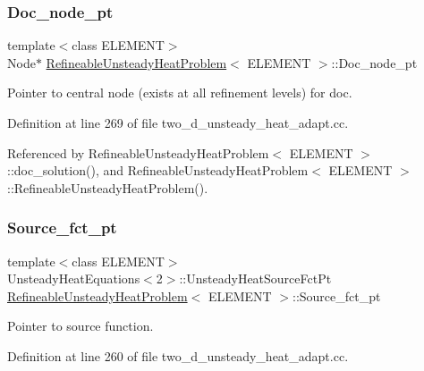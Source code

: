 \subsubsection{\texorpdfstring{Doc\+\_\+node\+\_\+pt}{Doc\_node\_pt}}
{\footnotesize\ttfamily template$<$class E\+L\+E\+M\+E\+NT$>$ \\
Node$\ast$ \hyperlink{classRefineableUnsteadyHeatProblem}{Refineable\+Unsteady\+Heat\+Problem}$<$ E\+L\+E\+M\+E\+NT $>$\+::Doc\+\_\+node\+\_\+pt\hspace{0.3cm}{\ttfamily [private]}}



Pointer to central node (exists at all refinement levels) for doc. 



Definition at line 269 of file two\+\_\+d\+\_\+unsteady\+\_\+heat\+\_\+adapt.\+cc.



Referenced by Refineable\+Unsteady\+Heat\+Problem$<$ E\+L\+E\+M\+E\+N\+T $>$\+::doc\+\_\+solution(), and Refineable\+Unsteady\+Heat\+Problem$<$ E\+L\+E\+M\+E\+N\+T $>$\+::\+Refineable\+Unsteady\+Heat\+Problem().

\mbox{\label{classRefineableUnsteadyHeatProblem_a99eb5a2cd4b680b4f83e739bd4e16639}} 
\subsubsection{\texorpdfstring{Source\+\_\+fct\+\_\+pt}{Source\_fct\_pt}}
{\footnotesize\ttfamily template$<$class E\+L\+E\+M\+E\+NT$>$ \\
Unsteady\+Heat\+Equations$<$2$>$\+::Unsteady\+Heat\+Source\+Fct\+Pt \hyperlink{classRefineableUnsteadyHeatProblem}{Refineable\+Unsteady\+Heat\+Problem}$<$ E\+L\+E\+M\+E\+NT $>$\+::Source\+\_\+fct\+\_\+pt\hspace{0.3cm}{\ttfamily [private]}}



Pointer to source function. 



Definition at line 260 of file two\+\_\+d\+\_\+unsteady\+\_\+heat\+\_\+adapt.\+cc.



